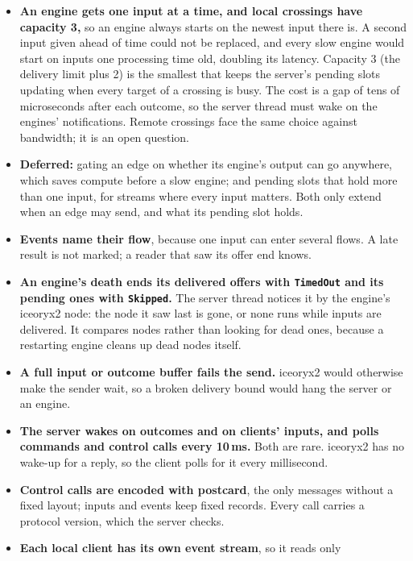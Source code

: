 \documentclass[11pt]{article}
\newcommand{\code}[1]{\texttt{#1}}
\begin{document}
\begin{itemize}[nosep]
  \item \textbf{An engine gets one input at a time, and local crossings
        have capacity 3,} so an engine always starts on the newest input
        there is. A second input given ahead of time could not be replaced,
        and every slow engine would start on inputs one processing time old,
        doubling its latency. Capacity 3 (the delivery limit plus 2) is the
        smallest that keeps the server's pending slots updating when every
        target of a crossing is busy. The cost is a gap of tens of
        microseconds after each outcome, so the server thread must wake on
        the engines' notifications. Remote crossings face the same choice
        against bandwidth; it is an open question.
  \item \textbf{Deferred:} gating an edge on whether its engine's output can
        go anywhere, which saves compute before a slow engine; and pending
        slots that hold more than one input, for streams where every input
        matters. Both only extend when an edge may send, and what its
        pending slot holds.
  \item \textbf{Events name their flow}, because one input can enter several
        flows. A late result is not marked; a reader that saw its offer end
        knows.
  \item \textbf{An engine's death ends its delivered offers with
        \code{TimedOut} and its pending ones with \code{Skipped}.} The server
        thread notices it by the engine's iceoryx2 node: the node it saw last
        is gone, or none runs while inputs are delivered. It compares nodes
        rather than looking for dead ones, because a restarting engine cleans
        up dead nodes itself.
  \item \textbf{A full input or outcome buffer fails the send.} iceoryx2
        would otherwise make the sender wait, so a broken delivery bound
        would hang the server or an engine.
  \item \textbf{The server wakes on outcomes and on clients' inputs, and
        polls commands and control calls every 10\,ms.} Both are rare.
        iceoryx2 has no wake-up for a reply, so the client polls for it every
        millisecond.
  \item \textbf{Control calls are encoded with postcard}, the only messages
        without a fixed layout; inputs and events keep fixed records. Every
        call carries a protocol version, which the server checks.
  \item \textbf{Each local client has its own event stream}, so it reads only

\end{itemize}
\end{document}
